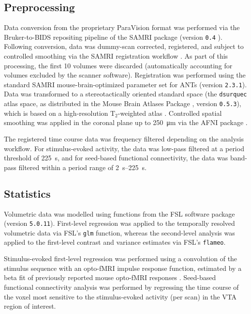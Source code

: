 \subsection{Preprocessing}

Data conversion from the proprietary ParaVision format was performed via the Bruker-to-BIDS repositing pipeline \cite{aowsis} of the SAMRI package (version \textcolor{mg}{\texttt{0.4}} \cite{samri}).
Following conversion, data was dummy-scan corrected, registered, and subject to controlled smoothing via the SAMRI registration workflow \cite{irsabi}.
As part of this processing, the first 10 volumes were discarded (automatically accounting for volumes excluded by the scanner software).
Registration was performed using the standard SAMRI mouse-brain-optimized parameter set for ANTs \cite{ants} (version \textcolor{mg}{\texttt{2.3.1}}).
Data was transformed to a stereotactically oriented standard space (the \textcolor{mg}{\texttt{dsurquec}} atlas space, as distributed in the Mouse Brain Atlases Package \cite{atlases_generator}, version \textcolor{mg}{\texttt{0.5.3}}), which is based on a high-resolution $\mathrm{T_2}$-weighted atlas \cite{dsu1}.
Controlled spatial smoothing was applied in the coronal plane up to \SI{250}{\micro\meter} via the AFNI package \cite{afni}.

The registered time course data was frequency filtered depending on the analysis workflow.
For stimulus-evoked activity, the data was low-pass filtered at a period threshold of \SI{225}{\second}, and for seed-based functional connectivity, the data was band-pass filtered within a period range of \SIrange{2}{225}{\second}.

\subsection{Statistics}
Volumetric data was modelled using functions from the FSL software package \cite{fsl} (version \textcolor{mg}{\texttt{5.0.11}}).
First-level regression was applied to the temporally resolved volumetric data via FSL's \textcolor{mg}{\texttt{glm}} function, whereas the second-level analysis was applied to the first-level contrast and variance estimates via FSL's \textcolor{mg}{\texttt{flameo}}.

Stimulus-evoked first-level regression was performed using a convolution of the stimulus sequence with an opto-fMRI impulse response function, estimated by a beta fit of previously reported mouse opto-fMRI responses \cite{Grandjean2019}.
Seed-based functional connectivity analysis was performed by regressing the time course of the voxel most sensitive to the stimulus-evoked activity (per scan) in the VTA region of interest.

